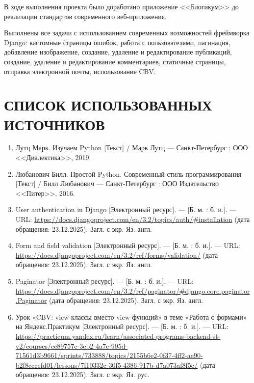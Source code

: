 \documentclass[bachelor, och, pract]{../SCWorks}
\begin{document}
В ходе выполнения проекта было доработано приложение <<Блогикум>> до реализации стандартов современного веб-приложения. 

Выполнены все задачи с использованием современных возможностей фреймворка Django: кастомные страницы ошибок, работа с пользователями, пагинация, добавление изображение, создание, удаление и редактирование публикаций, создание, удаление и редактирование комментариев, статичные страницы, отправка электронной почты, использование CBV.

\newpage
\section*{СПИСОК ИСПОЛЬЗОВАННЫХ ИСТОЧНИКОВ}

\begin{enumerate}
    \item Лутц Марк. Изучаем Python [Текст] / Марк Лутц --- Санкт-Петербург :  ООО <<Диалектика>>, 2019.
    \item Любанович Билл. Простой Python. Современный стиль программирования [Текст] / Билл Любанович --- Санкт-Петербург :  ООО Издательство <<Питер>>, 2016.
    \item User authentication in Django [Электронный ресурс]. — [Б. м. : б. и.]. — URL: \url{https://docs.djangoproject.com/en/3.2/topics/auth/#installation} (дата обращения: 23.12.2025). Загл. с экр. Яз. англ.

    \item Form and field validation [Электронный ресурс]. — [Б. м. : б. и.]. — URL: \url{https://docs.djangoproject.com/en/3.2/ref/forms/validation/} (дата обращения: 23.12.2025). Загл. с экр. Яз. англ.
    
    \item Paginator [Электронный ресурс]. — [Б. м. : б. и.]. — URL: \url{https://docs.djangoproject.com/en/3.2/ref/paginator/#django.core.paginator.Paginator} (дата обращения: 23.12.2025). Загл. с экр. Яз. англ.
    
    \item Урок «CBV: view-классы вместо view-функций» в теме «Работа с формами» на Яндекс.Практикум [Электронный ресурс]. — [Б. м. : б. и.]. — URL: \url{https://practicum.yandex.ru/learn/associated-programs-backend-st-v2/courses/ec89757c-3eb2-4a7c-995d-71561d3b9661/sprints/733888/topics/2155b6e2-0f37-4ff2-ae90-b2f8cccefd01/lessons/7f10332c-30f5-4386-917b-d7a073af8f5c/} (дата обращения: 23.12.2025). Загл. с экр. Яз. рус.



\end{enumerate}
\end{document}
